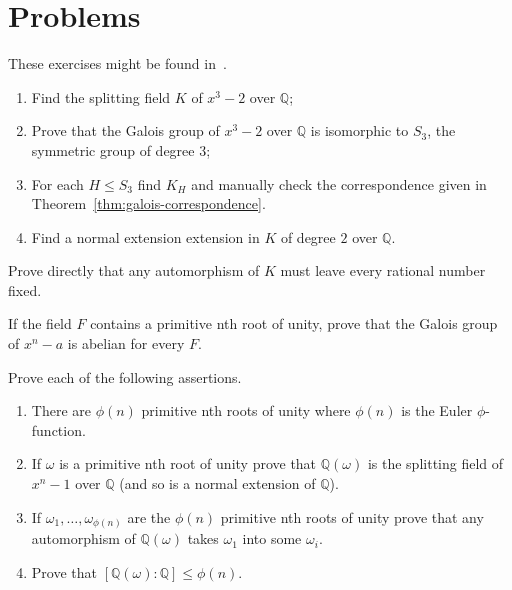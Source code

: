 \section{Problems}\label{sec:problems}

These exercises might be found in~\cite{herstein_topics_2010}.

\begin{problem}
\begin{enumerate}
	\item Find the splitting field $K$ of $x^{3}-2$ over $\mathbb{Q}$;
	\item Prove that the Galois group of $x^{3}-2$ over $\mathbb{Q}$ is
	      isomorphic to $S_{3}$, the symmetric group of degree $3$;
	\item For each ${H}\leqslant{S_{3}}$ find $K_{H}$ and manually check the
	      correspondence given in Theorem~\ref{thm:galois-correspondence}.
	\item Find a normal extension extension in $K$ of degree $2$ over
	      $\mathbb{Q}$.
\end{enumerate}
\end{problem}

\begin{problem}
Prove directly that any automorphism of $K$ must leave every rational number
fixed.
\end{problem}

\begin{problem}
If the field $F$ contains a primitive nth root of unity, prove that the
Galois group of $x^{n}-a$ is abelian for every $F$.
\end{problem}

\begin{problem}\label{problem:13}
  Prove each of the following assertions.
\begin{enumerate}
	\item There are $\phi(n)$ primitive nth roots of unity where $\phi(n)$ is the
        Euler $\phi$-function.
	\item If $\omega$ is a primitive nth root of unity prove that
	      $\mathbb{Q}(\omega)$ is the splitting field of $x^{n}-1$ over
	      $\mathbb{Q}$ (and so is a normal extension of $\mathbb{Q}$).
  \item If $\omega_{1},\ldots,\omega_{\phi(n)}$ are the $\phi(n)$ primitive nth
        roots of unity prove that any automorphism of $\mathbb{Q}(\omega)$
        takes $\omega_{1}$ into some $\omega_{i}$.
	\item Prove that $[\mathbb{Q}(\omega):\mathbb{Q}]\leqslant\phi(n)$.
\end{enumerate}
\end{problem}

